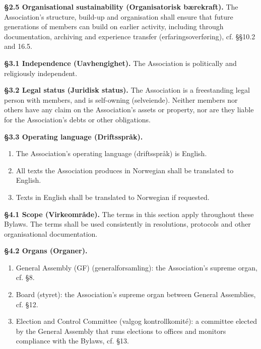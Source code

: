 \documentclass{../../../Common/Latex/Templates/rapport}
\begin{document}
\textbf{\S 2.5 Organisational sustainability (Organisatorisk bærekraft).} The Association's structure, build-up and organisation shall ensure that future generations of members can build on earlier activity, including through documentation, archiving and experience transfer (erfaringsoverføring), cf. \S\S10.2 and 16.5.

\textbf{\S 3.1 Independence (Uavhengighet).} The Association is politically and religiously independent.

\textbf{\S 3.2 Legal status (Juridisk status).} The Association is a freestanding legal person with members, and is self-owning (selveiende). Neither members nor others have any claim on the Association's assets or property, nor are they liable for the Association's debts or other obligations.

\textbf{\S 3.3 Operating language (Driftsspråk).}
\begin{enumerate}
  \item The Association's operating language (driftsspråk) is English.
  \item All texts the Association produces in Norwegian shall be translated to English.
  \item Texts in English shall be translated to Norwegian if requested.
\end{enumerate}

\textbf{\S 4.1 Scope (Virkeområde).} The terms in this section apply throughout these Bylaws. The terms shall be used consistently in resolutions, protocols and other organisational documentation.

\textbf{\S 4.2 Organs (Organer).}
\begin{enumerate}
  \item General Assembly (GF) (generalforsamling): the Association's supreme organ, cf. \S8.
  \item Board (styret): the Association's supreme organ between General Assemblies, cf. \S12.
  \item Election and Control Committee (valgog kontrollkomité): a committee elected by the General Assembly that runs elections to offices and monitors compliance with the Bylaws, cf. \S13.
\end{enumerate}
\end{document}
